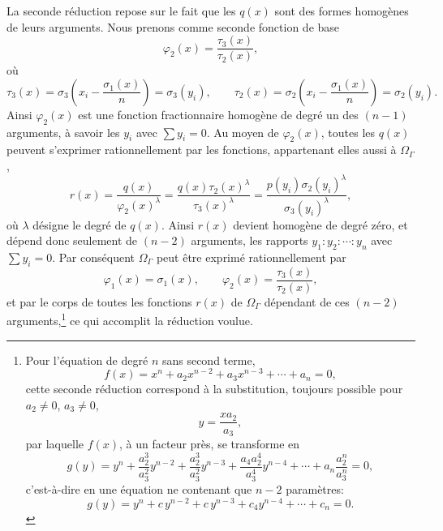 La seconde réduction repose sur le fait que les $q(x)$ sont des formes homogènes de leurs arguments. Nous prenons comme seconde fonction de base
\[
\varphi_2(x)=\frac{\tau_3(x)}{\tau_2(x)},
\]
où
\[
\tau_3(x)=\sigma_3\left(x_i-\frac{\sigma_1(x)}{n}\right)=\sigma_3(y_i),
\qquad
\tau_2(x)=\sigma_2\left(x_i-\frac{\sigma_1(x)}{n}\right)=\sigma_2(y_i).
\]
Ainsi $\varphi_2(x)$ est une fonction fractionnaire homogène de degré un des $(n-1)$ arguments, à savoir les $y_i$ avec $\sum y_i=0$. Au moyen de $\varphi_2(x)$, toutes les $q(x)$ peuvent s'exprimer rationnellement par les fonctions, appartenant elles aussi à $\Omega_\Gamma$,
\[
r(x)=\frac{q(x)}{\varphi_2(x)^\lambda}
=\frac{q(x)\tau_2(x)^\lambda}{\tau_3(x)^\lambda}
=\frac{p(y_i)\sigma_2(y_i)^\lambda}{\sigma_3(y_i)^\lambda},
\]
où $\lambda$ désigne le degré de $q(x)$. Ainsi $r(x)$ devient homogène de degré zéro, et dépend donc seulement de $(n-2)$ arguments, les rapports $y_1:y_2:\cdots:y_n$ avec $\sum y_i=0$. Par conséquent $\Omega_\Gamma$ peut être exprimé rationnellement par
\[
\varphi_1(x)=\sigma_1(x),
\qquad
\varphi_2(x)=\frac{\tau_3(x)}{\tau_2(x)},
\]
et par le corps de toutes les fonctions $r(x)$ de $\Omega_\Gamma$ dépendant de ces $(n-2)$ arguments,\footnote{Pour l'équation de degré $n$ sans second terme,
\[
f(x)=x^n+a_2x^{n-2}+a_3x^{n-3}+\cdots+a_n=0,
\]
cette seconde réduction correspond à la substitution, toujours possible pour $a_2\ne0$, $a_3\ne0$,
\[
y=\frac{x a_2}{a_3},
\]
par laquelle $f(x)$, à un facteur près, se transforme en
\[
g(y)=y^n+\frac{a_2^3}{a_3^2}y^{n-2}+\frac{a_2^3}{a_3^2}y^{n-3}
+\frac{a_4a_2^4}{a_3^4}y^{n-4}+\cdots+a_n\frac{a_2^n}{a_3^n}=0,
\]
c'est-à-dire en une équation ne contenant que $n-2$ paramètres:
\[
g(y)=y^n+c\,y^{n-2}+c\,y^{n-3}+c_4y^{n-4}+\cdots+c_n=0.
\]} ce qui accomplit la réduction voulue.

